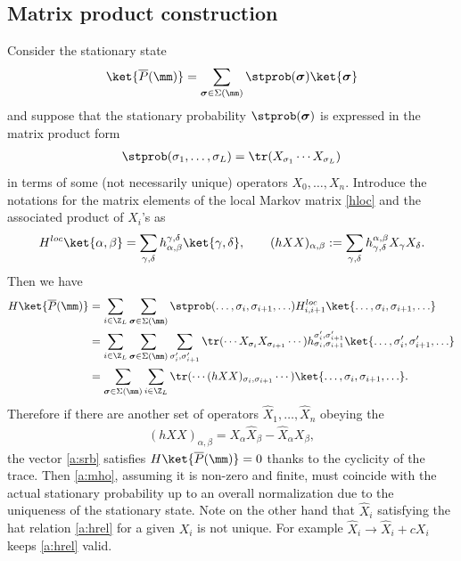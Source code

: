 \subsection{Matrix product construction}\label{a:subsec:mp}

Consider the stationary state
\begin{align}\label{a:srb}
\ket{\overline{P}(\mm)} = \sum_{{\boldsymbol \sigma} \in \Sigma(\mm)}
\stprob({\boldsymbol \sigma}) \ket{ {\boldsymbol \sigma} }
\end{align}
and suppose that the stationary probability $\stprob({\boldsymbol \sigma})$ 
is expressed in the matrix product form
\begin{align}\label{a:mho}
\stprob(\sigma_1,\ldots, \sigma_L) 
= \tr (X_{\sigma_1}\cdots X_{\sigma_L})
\end{align}
in terms of some (not necessarily unique) operators $X_0, \ldots, X_n$.
Introduce the notations for the matrix elements of the local Markov matrix \eqref{hloc} and 
the associated product of $X_i$'s as
\begin{align}\label{a:hdef}
H^{loc}\ket{\alpha, \beta } = \sum_{\gamma,\delta}h^{\gamma,\delta}_{\alpha,\beta}
\ket{\gamma, \delta},\qquad
(hXX)_{\alpha, \beta} := \sum_{\gamma,\delta}h^{\alpha,\beta}_{\gamma,\delta}
X_\gamma X_\delta.
\end{align}
Then we have
\begin{align*}
H  \ket{\overline{P}(\mm)} 
&= \sum_{i \in \Z_L}
\sum_{\boldsymbol \sigma \in \Sigma(\mm)} \stprob(\ldots, \sigma_i, \sigma_{i+1},\ldots) H^{loc}_{i,i+1}
\ket{\ldots, \sigma_i, \sigma_{i+1},\ldots}\\
&= \sum_{i \in \Z_L} \sum_{\boldsymbol \sigma \in \Sigma(\mm)} \sum_{\sigma'_i, \sigma'_{i+1}}
\tr(\cdots X_{\sigma_i}X_{\sigma_{i+1}}\cdots )
h^{\sigma'_i, \sigma'_{i+1}}_{\sigma_i, \sigma_{i+1}}
\ket{\ldots, \sigma'_i, \sigma'_{i+1},\ldots}\\
&= \sum_{\boldsymbol \sigma \in \Sigma(\mm)}\sum_{i \in \Z_L}
\tr(\cdots (hXX)_{\sigma_i, \sigma_{i+1}}\cdots )
\ket{\ldots, \sigma_i, \sigma_{i+1},\ldots}.
\end{align*}
Therefore if there are another set of operators 
${\widehat X}_1, \ldots, {\widehat X}_n$ obeying the 
\begin{align}\label{a:hrel}
(hXX)_{\alpha, \beta} = X_\alpha {\widehat X}_\beta - {\widehat X}_\alpha X_\beta,
\end{align}
the vector \eqref{a:srb}  satisfies $H\ket{\overline{P}(\mm)} = 0$ 
thanks to the cyclicity of the trace.
Then \eqref{a:mho}, assuming it is non-zero and finite, must coincide with the actual stationary probability 
up to an overall normalization due to the uniqueness of the stationary state.
Note on the other hand that ${\widehat X}_i$ satisfying the hat relation \eqref{a:hrel}
for a given $X_i$ is not unique.
For example
${\widehat X}_i \rightarrow {\widehat X}_i+ c X_i$ keeps \eqref{a:hrel} valid.

